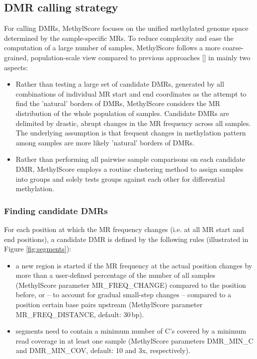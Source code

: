 \documentclass{article}
\begin{document}
\subsection{DMR calling strategy}
\label{DMRs}

For calling DMRs, MethylScore focuses on the unified methylated genome space determined by the sample-specific MRs. To reduce complexity and ease the computation of a large number of samples, MethylScore follows a more coarse-grained, population-scale view compared to previous approaches [\cite{Hagmann2015}] in mainly two aspects:
\begin{itemize}
	\item Rather than testing a large set of candidate DMRs, generated by all combinations of individual MR start and end coordinates as the attempt to find the 'natural' borders of DMRs, MethylScore considers the MR distribution of the whole population of samples. Candidate DMRs are delimited by drastic, abrupt changes in the MR frequency across all samples. The underlying assumption is that frequent changes in methylation pattern among samples are more likely 'natural' borders of DMRs.
	\item Rather than performing all pairwise sample comparisons on each candidate DMR, MethylScore employs a routine clustering method to assign samples into groups and solely tests groups against each other for differential methylation.
\end{itemize}


\subsubsection*{Finding candidate DMRs}
\label{segments}

For each position at which the MR frequency changes (i.e. at all MR start and end positions), a candidate DMR is defined by the following rules (illustrated in Figure \ref{fig:segments}):

\begin{itemize}
	\item a new region is started if the MR frequency at the actual position changes by more than a user-defined percentage of the number of all samples (MethylScore parameter \mbox{MR\_FREQ\_CHANGE}) compared to the position before, or -- to account for gradual small-step changes -- compared to a position certain base pairs upstream (MethylScore parameter MR\_FREQ\_DISTANCE, default: 30\,bp).
	\item segments need to contain a minimum number of C's covered by a minimum read coverage in at least one sample (MethylScore parameters DMR\_MIN\_C and DMR\_MIN\_COV, default: 10 and 3x, respectively).
\end{itemize}
\end{document}
